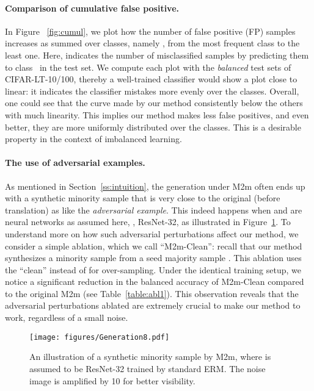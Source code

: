 \vspace{-0.15in}
\paragraph{Comparison of cumulative false positive.} In Figure ~\ref{fig:cumul}, we plot how the number of false positive (FP) samples increases as summed over classes, namely  , from the most frequent class to the least one. Here,  indicates the number of misclassified samples by predicting them to class~ in the test set. We compute each plot with the \emph{balanced} test sets of CIFAR-LT-10/100, thereby a well-trained classifier would show a plot close to linear: it indicates the classifier mistakes more evenly over the classes. Overall, one could see that the curve made by our method consistently below the others with much linearity. This implies our method makes less false positives, and even better, they are more uniformly distributed over the classes. This is a desirable property in the context of imbalanced learning.

\vspace{-0.15in}
\paragraph{The use of adversarial examples.}
As mentioned in Section~\ref{ss:intuition}, the generation under M2m often ends up with a synthetic minority sample that is very close to the original (before translation) as like the \emph{adversarial example}. This indeed happens when  and  are neural networks as assumed here, \ie, ResNet-32, as illustrated in Figure~\ref{fig:generation}.
To understand more on how such adversarial perturbations affect our method, we consider a simple ablation, which we call ``M2m-Clean'': recall that our method synthesizes a minority sample  from a seed majority sample . This ablation uses the ``clean''  instead of  for over-sampling.
Under the identical training setup, we notice a significant reduction in the balanced accuracy of M2m-Clean compared to the original M2m (see Table~\ref{table:abl1}). This observation reveals that the adversarial perturbations ablated are extremely crucial to make our method to work, regardless of a small noise. 

\begin{figure}[t]
    \begin{center}
	    \texttt{[image: figures/Generation8.pdf]}
    \end{center}
    \vspace{-0.12in}
    \caption{An illustration of a synthetic minority sample by M2m, where  is assumed to be ResNet-32 trained by standard ERM. The noise image is amplified by 10 for better visibility.}
    \label{fig:generation}
    \vspace{-0.15in}
\end{figure}

